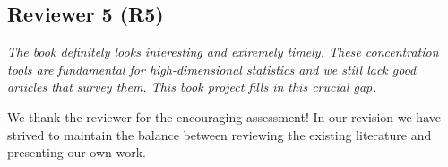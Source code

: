 \documentclass[11pt]{article}
\begin{document}
   \subsection{Reviewer 5 (R5)}
   
  {\em The book definitely looks interesting and extremely timely. These concentration tools are fundamental for high-dimensional statistics 
  and we still lack good articles that survey them. This book project fills in this crucial gap.}
  
  
  \bigskip
\noindent   We thank the reviewer for the encouraging assessment!  In our revision we have strived to maintain the balance between reviewing the
   existing literature and presenting our own work.  
   
   
   
\end{document}
